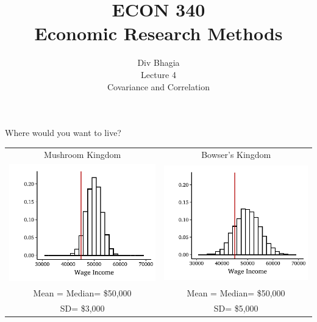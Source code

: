\documentclass{./../div_teaching_slides}
\begin{document}
\title{ECON 340 \\ Economic Research Methods}
\author{Div Bhagia \\\vspace{1.75em}
Lecture 4 \\\vspace{0.25em} \small Covariance and Correlation}
\date{}

\begin{frame}
\maketitle
\end{frame}

\begin{frame}{Where would you want to live?}
\centering \vspace{-0.5em}
\begin{tabular}{cc}
Mushroom Kingdom  & Bowser's Kingdom \\
\includegraphics{./../../Output/income_mk_z.pdf} &
\includegraphics{./../../Output/income_bk_z.pdf} \\ 
Mean = Median= \$50,000 & Mean = Median= \$50,000 \\
SD= \$3,000 & SD= \$5,000 \\
\end{tabular}
\end{frame}
\end{document}
